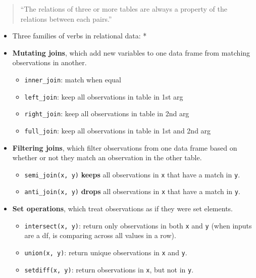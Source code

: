 \documentclass[]{book}
\providecommand{\tightlist}{%
  \setlength{\itemsep}{0pt}\setlength{\parskip}{0pt}}
\theoremstyle{definition}
\theoremstyle{definition}
\theoremstyle{definition}
\theoremstyle{remark}
\begin{document}
\begin{quote}
``The relations of three or more tables are always a property of the
relations between each pairs.''
\end{quote}

\begin{itemize}
\item
  Three families of verbs in relational data: *
\item
  \textbf{Mutating joins}, which add new variables to one data frame
  from matching observations in another.

  \begin{itemize}
  \tightlist
  \item
    \texttt{inner\_join}: match when equal
  \item
    \texttt{left\_join}: keep all observations in table in 1st arg
  \item
    \texttt{right\_join}: keep all observations in table in 2nd arg
  \item
    \texttt{full\_join}: keep all observations in table in 1st and 2nd
    arg
  \end{itemize}
\item
  \textbf{Filtering joins}, which filter observations from one data
  frame based on whether or not they match an observation in the other
  table.

  \begin{itemize}
  \tightlist
  \item
    \texttt{semi\_join(x,\ y)} \textbf{keeps} all observations in
    \texttt{x} that have a match in \texttt{y}.
  \item
    \texttt{anti\_join(x,\ y)} \textbf{drops} all observations in
    \texttt{x} that have a match in \texttt{y}.
  \end{itemize}
\item
  \textbf{Set operations}, which treat observations as if they were set
  elements.

  \begin{itemize}
  \tightlist
  \item
    \texttt{intersect(x,\ y)}: return only observations in both
    \texttt{x} and \texttt{y} (when inputs are a df, is comparing across
    all values in a row).
  \item
    \texttt{union(x,\ y)}: return unique observations in \texttt{x} and
    \texttt{y}.
  \item
    \texttt{setdiff(x,\ y)}: return observations in \texttt{x}, but not
    in \texttt{y}.
  \end{itemize}
\end{itemize}
\end{document}
